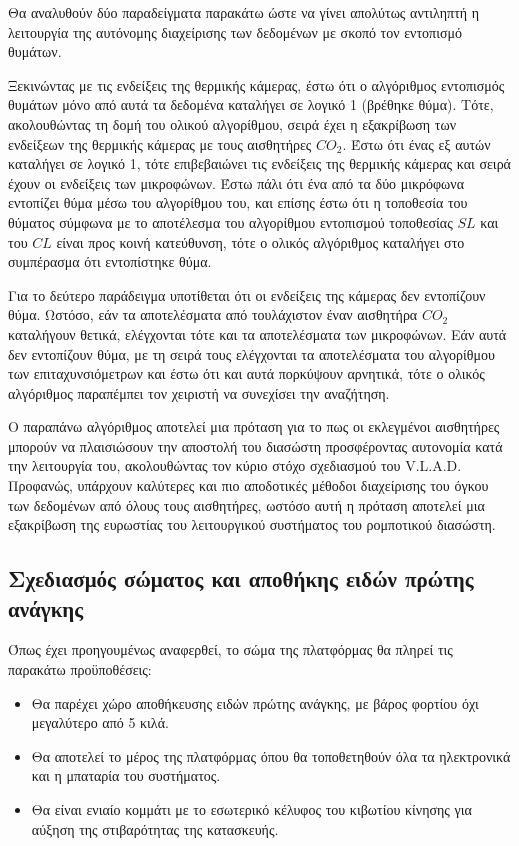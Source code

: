 Θα αναλυθούν δύο παραδείγματα παρακάτω ώστε να γίνει απολύτως αντιληπτή η λειτουργία της αυτόνομης διαχείρισης των δεδομένων με σκοπό τον εντοπισμό θυμάτων.
\par Ξεκινώντας με τις ενδείξεις της θερμικής κάμερας, έστω ότι ο αλγόριθμος εντοπισμός θυμάτων μόνο από αυτά τα δεδομένα καταλήγει σε λογικό 1 (βρέθηκε θύμα). Τότε, ακολουθώντας τη δομή του ολικού αλγορίθμου, σειρά έχει η εξακρίβωση των ενδείξεων της θερμικής κάμερας με τους αισθητήρες $CO_2$. Έστω ότι ένας εξ αυτών καταλήγει σε λογικό 1, τότε επιβεβαιώνει τις ενδείξεις της θερμικής κάμερας και σειρά έχουν οι ενδείξεις των μικροφώνων. Έστω πάλι ότι ένα από τα δύο μικρόφωνα εντοπίζει θύμα μέσω του αλγορίθμου του, και επίσης έστω ότι η τοποθεσία του θύματος σύμφωνα με το αποτέλεσμα του αλγορίθμου εντοπισμού τοποθεσίας $SL$ και του $CL$ είναι προς κοινή κατεύθυνση, τότε ο ολικός αλγόριθμος καταλήγει στο συμπέρασμα ότι εντοπίστηκε θύμα.
\par Για το δεύτερο παράδειγμα υποτίθεται ότι οι ενδείξεις της κάμερας δεν εντοπίζουν θύμα. Ωστόσο, εάν τα αποτελέσματα από τουλάχιστον έναν αισθητήρα $CO_2$ καταλήγουν θετικά, ελέγχονται τότε και τα αποτελέσματα των μικροφώνων. Εάν αυτά δεν εντοπίζουν θύμα, με τη σειρά τους ελέγχονται τα αποτελέσματα του αλγορίθμου των επιταχυνσιόμετρων και έστω ότι και αυτά πορκύψουν αρνητικά, τότε ο ολικός αλγόριθμος παραπέμπει τον χειριστή να συνεχίσει την αναζήτηση.
\par Ο παραπάνω αλγόριθμος αποτελεί μια πρόταση για το πως οι εκλεγμένοι αισθητήρες μπορούν να πλαισιώσουν την αποστολή του διασώστη προσφέροντας αυτονομία κατά την λειτουργία του, ακολουθώντας τον κύριο στόχο σχεδιασμού του V.L.A.D. Προφανώς, υπάρχουν καλύτερες και πιο αποδοτικές μέθοδοι διαχείρισης του όγκου των δεδομένων από όλους τους αισθητήρες, ωστόσο αυτή η πρόταση αποτελεί μια εξακρίβωση της ευρωστίας του λειτουργικού συστήματος του ρομποτικού διασώστη.









\subsection{Σχεδιασμός σώματος και αποθήκης ειδών πρώτης ανάγκης}
Όπως έχει προηγουμένως αναφερθεί, το σώμα της πλατφόρμας θα πληρεί τις παρακάτω προϋποθέσεις:
\begin{itemize}
    \item Θα παρέχει χώρο αποθήκευσης ειδών πρώτης ανάγκης, με βάρος φορτίου όχι μεγαλύτερο από 5 κιλά.
    \item Θα αποτελεί το μέρος της πλατφόρμας όπου θα τοποθετηθούν όλα τα ηλεκτρονικά και η μπαταρία του συστήματος.
    \item Θα είναι ενιαίο κομμάτι με το εσωτερικό κέλυφος του κιβωτίου κίνησης για αύξηση της στιβαρότητας της κατασκευής.
\end{itemize}

